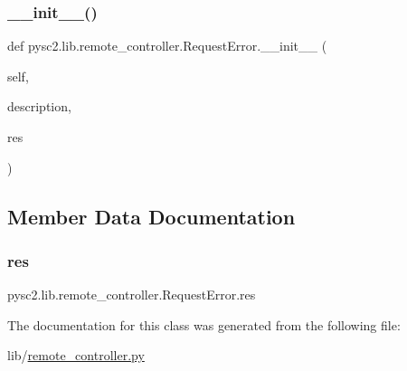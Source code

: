 \subsubsection{\texorpdfstring{\+\_\+\+\_\+init\+\_\+\+\_\+()}{\_\_init\_\_()}}
{\footnotesize\ttfamily def pysc2.\+lib.\+remote\+\_\+controller.\+Request\+Error.\+\_\+\+\_\+init\+\_\+\+\_\+ (\begin{DoxyParamCaption}\item[{}]{self,  }\item[{}]{description,  }\item[{}]{res }\end{DoxyParamCaption})}



\subsection{Member Data Documentation}
\mbox{\label{classpysc2_1_1lib_1_1remote__controller_1_1_request_error_a97e49b4d4a788e0100334a2c337557c5}} 
\subsubsection{\texorpdfstring{res}{res}}
{\footnotesize\ttfamily pysc2.\+lib.\+remote\+\_\+controller.\+Request\+Error.\+res}



The documentation for this class was generated from the following file\+:\begin{DoxyCompactItemize}
\item 
lib/\mbox{\hyperlink{remote__controller_8py}{remote\+\_\+controller.\+py}}\end{DoxyCompactItemize}
